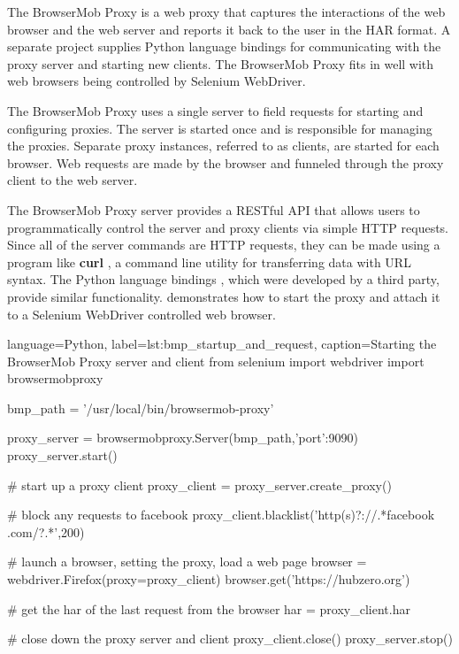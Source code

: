 
The BrowserMob Proxy \cite{BrowserMOBProxy:Online} is a web proxy that captures
the interactions of the web browser and the web server and reports it back to
the user in the HAR format. A separate project supplies Python language
bindings for communicating with the proxy server and starting new clients. The
BrowserMob Proxy fits in well with web browsers being controlled by Selenium
WebDriver.

The BrowserMob Proxy uses a single server to field requests for starting and
configuring proxies.  The server is started once and is responsible for
managing the proxies.  Separate proxy instances, referred to as clients, are
started for each browser.  Web requests are made by the browser and funneled
through the proxy client to the web server.


The BrowserMob Proxy server provides a RESTful \cite{REST:Online} API that
allows users to programmatically control the server and proxy clients via
simple HTTP requests.  Since all of the server commands are HTTP requests, they
can be made using a program like \textbf{curl} \cite{Curl:Online}, a command
line utility for transferring data with URL syntax. The Python language
bindings \cite{BrowserMOBProxyPyBindings:Online}, which were developed by a
third party, provide similar functionality.  
demonstrates how to start the proxy and attach it to a Selenium WebDriver
controlled web browser.

\begin{xcode}{%
  language=Python,%
  label=lst:bmp_startup_and_request,%
  caption={Starting the BrowserMob Proxy server and client}%
}
from selenium import webdriver
import browsermobproxy

bmp_path = '/usr/local/bin/browsermob-proxy'

proxy_server = browsermobproxy.Server(bmp_path,{'port':9090})
proxy_server.start()

# start up a proxy client
proxy_client = proxy_server.create_proxy()

# block any requests to facebook
proxy_client.blacklist('http(s)?://.*facebook\\.com/?.*',200)

# launch a browser, setting the proxy, load a web page
browser = webdriver.Firefox(proxy=proxy_client)
browser.get('https://hubzero.org')

# get the har of the last request from the browser
har = proxy_client.har

# close down the proxy server and client
proxy_client.close()
proxy_server.stop()
\end{xcode}


